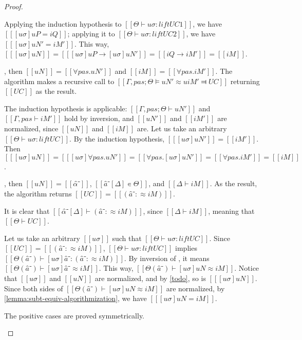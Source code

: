 \begin{proof}
\begin{caseof}
        Applying the induction hypothesis to $[[Θ ⊢ uσ : lift UC1]]$, we have
        $[[ [uσ]uP = iQ ]]$; applying it to $[[Θ ⊢ uσ : lift UC2]]$, we have
        $[[ [uσ]uN' = iM' ]]$.
        This way, $[[ [uσ]uN ]] = [[ [uσ]uP → [uσ]uN' ]] = [[ iQ → iM' ]] = [[ iM ]]$.

        \item {}, then $[[uN]] = [[∀pas.uN']]$ and $[[iM]] = [[∀pas.iM']]$.
        The algorithm makes a recursive call to $[[Γ,pas ; Θ ⊨ uN' ≈u iM' ⫤ UC]]$
        returning $[[UC]]$ as the result.

        The induction hypothesis is applicable: $[[Γ,pas ; Θ ⊢ uN']]$ and $[[Γ,pas ⊢ iM']]$ hold
        by inversion, and $[[uN']]$ and $[[iM']]$ are normalized, since $[[uN]]$ and $[[iM]]$ are.
        Let us take an arbitrary $[[Θ ⊢ uσ : lift UC]]$.
        By the induction hypothesis, $[[ [uσ]uN' ]] = [[ iM' ]]$. 
        Then $[[ [uσ]uN ]] = [[ [uσ]∀pas.uN' ]] = [[ ∀pas.[uσ]uN' ]] = [[ ∀pas.iM' ]] = [[ iM ]]$.

        \item {}, then $[[uN]] = [[α̂⁻]]$, $[[â⁻[Δ] ∊ Θ]]$, and $[[Δ ⊢ iM]]$.
        As the result, the algorithm returns $[[UC]] = [[ (â⁻ :≈ iM) ]]$.

        It is clear that $[[α̂⁻[Δ] ⊢ (â⁻ :≈ iM) ]]$, since $[[Δ ⊢ iM]]$, 
        meaning that $[[Θ ⊢ UC]]$.

        Let us take an arbitrary $[[uσ]]$ such that  $[[Θ ⊢ uσ : lift UC]]$.
        Since $[[UC]] = [[ (â⁻ :≈ iM) ]]$, $[[Θ ⊢ uσ : lift UC]]$ implies 
        $[[Θ(â⁻) ⊢ [uσ]â⁻ : (â⁻ :≈ iM) ]]$.
        By inversion of , it  means $[[Θ(â⁻) ⊢ [uσ]â⁻ ≈ iM]]$.
        This way, $[[Θ(â⁻) ⊢ [uσ]uN ≈ iM]]$. 
        Notice that $[[uσ]]$ and $[[uN]]$ are normalized, and by \cref{todo}, so is $[[ [uσ]uN ]]$.
        Since both sides of $[[Θ(â⁻) ⊢ [uσ]uN ≈ iM]]$ are normalized,
        by \cref{lemma:subt-equiv-algorithmization}, we have $[[ [uσ]uN = iM ]]$.

        \item The positive cases are proved symmetrically.
    \end{caseof}
\end{proof}

